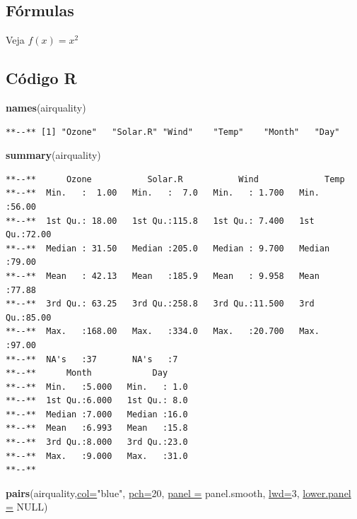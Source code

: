 \documentclass[12pt,brazil,]{article}
\newenvironment{Shaded}{\begin{snugshade}}{\end{snugshade}}
\newcommand{\DataTypeTok}[1]{\textcolor[rgb]{0.74,0.68,0.62}{\underline{#1}}}
\newcommand{\DecValTok}[1]{\textcolor[rgb]{0.27,0.67,0.26}{#1}}
\newcommand{\KeywordTok}[1]{\textcolor[rgb]{0.26,0.66,0.93}{\textbf{#1}}}
\newcommand{\NormalTok}[1]{\textcolor[rgb]{0.74,0.68,0.62}{#1}}
\newcommand{\OtherTok}[1]{\textcolor[rgb]{0.74,0.68,0.62}{#1}}
\newcommand{\StringTok}[1]{\textcolor[rgb]{0.02,0.61,0.04}{#1}}
\begin{document}
\hypertarget{fuxf3rmulas}{%
\subsection{Fórmulas}\label{fuxf3rmulas}}

Veja \(f(x)=x^2\)

\hypertarget{cuxf3digo-r}{%
\subsection{Código R}\label{cuxf3digo-r}}

\begin{Shaded}
\begin{Highlighting}[]
\KeywordTok{names}\NormalTok{(airquality)}
\end{Highlighting}
\end{Shaded}

\begin{verbatim}
**--** [1] "Ozone"   "Solar.R" "Wind"    "Temp"    "Month"   "Day"
\end{verbatim}

\begin{Shaded}
\begin{Highlighting}[]
\KeywordTok{summary}\NormalTok{(airquality)}
\end{Highlighting}
\end{Shaded}

\begin{verbatim}
**--**      Ozone           Solar.R           Wind             Temp      
**--**  Min.   :  1.00   Min.   :  7.0   Min.   : 1.700   Min.   :56.00  
**--**  1st Qu.: 18.00   1st Qu.:115.8   1st Qu.: 7.400   1st Qu.:72.00  
**--**  Median : 31.50   Median :205.0   Median : 9.700   Median :79.00  
**--**  Mean   : 42.13   Mean   :185.9   Mean   : 9.958   Mean   :77.88  
**--**  3rd Qu.: 63.25   3rd Qu.:258.8   3rd Qu.:11.500   3rd Qu.:85.00  
**--**  Max.   :168.00   Max.   :334.0   Max.   :20.700   Max.   :97.00  
**--**  NA's   :37       NA's   :7                                       
**--**      Month            Day      
**--**  Min.   :5.000   Min.   : 1.0  
**--**  1st Qu.:6.000   1st Qu.: 8.0  
**--**  Median :7.000   Median :16.0  
**--**  Mean   :6.993   Mean   :15.8  
**--**  3rd Qu.:8.000   3rd Qu.:23.0  
**--**  Max.   :9.000   Max.   :31.0  
**--** 
\end{verbatim}

\begin{Shaded}
\begin{Highlighting}[]
\KeywordTok{pairs}\NormalTok{(airquality,}\DataTypeTok{col=}\StringTok{"blue"}\NormalTok{, }\DataTypeTok{pch=}\DecValTok{20}\NormalTok{,}
      \DataTypeTok{panel =}\NormalTok{ panel.smooth, }\DataTypeTok{lwd=}\DecValTok{3}\NormalTok{, }\DataTypeTok{lower.panel =} \OtherTok{NULL}\NormalTok{)}
\end{Highlighting}
\end{Shaded}
\end{document}
